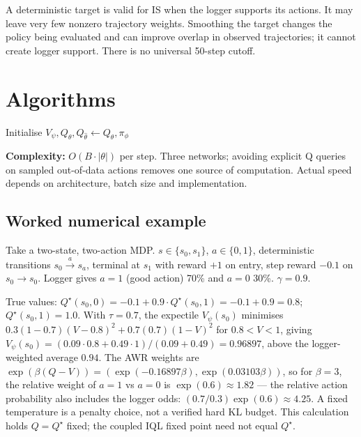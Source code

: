 \documentclass[11pt,oneside]{scrbook}
\begin{document}
\begin{pitfall}
A deterministic target is valid for IS when the logger supports its actions.
It may leave very few nonzero trajectory weights. Smoothing the target changes
the policy being evaluated and can improve overlap in observed trajectories;
it cannot create logger support. There is no universal 50-step cutoff.
\end{pitfall}

\chapter{Algorithms}

\begin{algorithm}[H]
\caption{IQL --- Implicit Q-Learning}
Initialise $V_\psi, Q_\theta, Q_{\hat\theta} \leftarrow Q_\theta, \pi_\phi$\;
\end{algorithm}
\textbf{Complexity:} $O(B \cdot |\theta|)$ per step. Three networks; avoiding explicit Q queries on sampled out-of-data actions removes one source of computation. Actual speed depends on architecture, batch size and implementation.

\section{Worked numerical example}

Take a two-state, two-action MDP. $s \in \{s_0, s_1\}$, $a \in \{0, 1\}$,
deterministic transitions $s_0 \xrightarrow{a} s_a$, terminal at $s_1$ with reward $+1$
on entry, step reward $-0.1$ on $s_0 \to s_0$. Logger gives $a=1$ (good action) 70\% and
$a=0$ 30\%. $\gamma = 0.9$.

True values: $Q^\star(s_0, 0) = -0.1 + 0.9 \cdot Q^\star(s_0,1) = -0.1 + 0.9 = 0.8$;
$Q^\star(s_0, 1) = 1.0$. With $\tau = 0.7$, the expectile $V_\psi(s_0)$
minimises $0.3(1-0.7)(V-0.8)^2+0.7(0.7)(1-V)^2$ for $0.8<V<1$, giving
$V_\psi(s_0) = (0.09\cdot0.8+0.49\cdot1)/(0.09+0.49) = 0.96897$, above the logger-weighted average $0.94$.
The AWR weights are $\exp(\beta(Q-V)) = (\exp(-0.16897 \beta), \exp(0.03103 \beta))$, so for
$\beta=3$, the relative weight of $a=1$ vs $a=0$ is $\exp(0.6) \approx 1.82$ --- the
relative action probability also includes the logger odds: $(0.7/0.3)\exp(0.6)\approx4.25$. A fixed temperature is a penalty choice, not a verified hard KL budget. This calculation holds $Q=Q^\star$ fixed; the coupled IQL fixed point need not equal $Q^\star$.
\end{document}
